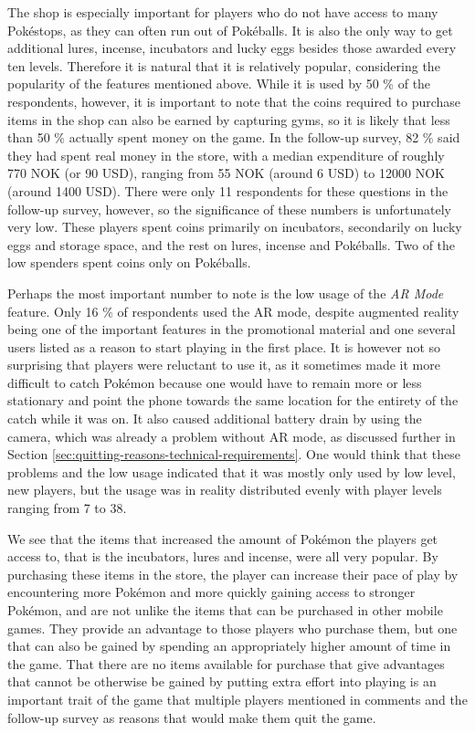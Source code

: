 The shop is especially important for players who do not have access to many Pokéstops, as they can often run out of Pokéballs. It is also the only way to get additional lures, incense, incubators and lucky eggs besides those awarded every ten levels. Therefore it is natural that it is relatively popular, considering the popularity of the features mentioned above. While it is used by 50 \% of the respondents, however, it is important to note that the coins required to purchase items in the shop can also be earned by capturing gyms, so it is likely that less than 50 \% actually spent money on the game. In the follow-up survey, 82 \% said they had spent real money in the store, with a median expenditure of roughly 770 NOK (or 90 USD), ranging from 55 NOK (around 6 USD) to 12000 NOK (around 1400 USD). There were only 11 respondents for these questions in the follow-up survey, however, so the significance of these numbers is unfortunately very low. These players spent coins primarily on incubators, secondarily on lucky eggs and storage space, and the rest on lures, incense and Pokéballs. Two of the low spenders spent coins only on Pokéballs.

Perhaps the most important number to note is the low usage of the \emph{AR Mode} feature. Only 16 \% of respondents used the AR mode, despite augmented reality being one of the important features in the promotional material and one several users listed as a reason to start playing in the first place. It is however not so surprising that players were reluctant to use it, as it sometimes made it more difficult to catch Pokémon because one would have to remain more or less stationary and point the phone towards the same location for the entirety of the catch while it was on. It also caused additional battery drain by using the camera, which was already a problem without AR mode, as discussed further in Section \ref{sec:quitting-reasons-technical-requirements}. One would think that these problems and the low usage indicated that it was mostly only used by low level, new players, but the usage was in reality distributed evenly with player levels ranging from 7 to 38.

We see that the items that increased the amount of Pokémon the players get access to, that is the incubators, lures and incense, were all very popular. By purchasing these items in the store, the player can increase their pace of play by encountering more Pokémon and more quickly gaining access to stronger Pokémon, and are not unlike the items that can be purchased in other mobile games. They provide an advantage to those players who purchase them, but one that can also be gained by spending an appropriately higher amount of time in the game. That there are no items available for purchase that give advantages that cannot be otherwise be gained by putting extra effort into playing is an important trait of the game that multiple players mentioned in comments and the follow-up survey as reasons that would make them quit the game.

